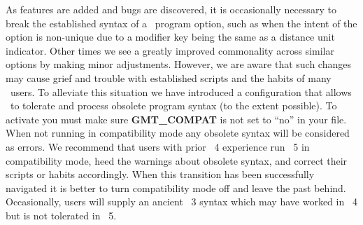 As features are added and bugs are discovered, it is occasionally necessary to break
the established syntax of a \gmt\ program option, such as when the intent of the option
is non-unique due to a modifier key being the same as a distance unit indicator.  Other times we see a greatly improved
commonality across similar options by making minor adjustments.  However, we are aware that
such changes may cause grief and trouble with established scripts and the habits of many \gmt\ users.
To alleviate this situation we have introduced a configuration that allows \gmt\ to
tolerate and process obsolete program syntax (to the extent possible).  To activate you must
make sure {\bf GMT\_COMPAT} is not set to ``no'' in your  file.  When not
running in compatibility mode any obsolete syntax will be considered as errors.  We recommend
that users with prior \gmt\ 4 experience run \gmt\ 5 in compatibility mode, heed the warnings
about obsolete syntax, and correct their scripts or habits accordingly.  When this transition
has been successfully navigated it is better to turn compatibility mode off and leave the
past behind.  Occasionally, users will supply an ancient \gmt\ 3 syntax which
may have worked in \gmt\ 4 but is not tolerated in \gmt\ 5.

